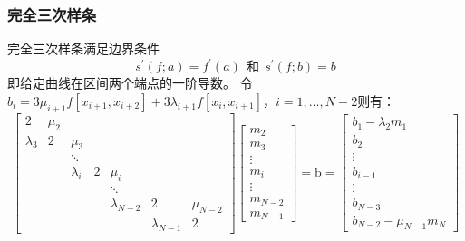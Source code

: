 \documentclass[a4paper]{article}
\begin{document}
\subsubsection{完全三次样条}
完全三次样条满足边界条件
\begin{equation}
    s^\prime(f;a) = f^\prime(a) \ \ 和 \ \ s^\prime(f;b)=b
\end{equation}
即给定曲线在区间两个端点的一阶导数。
令$b_i =3\mu_{i+1} f[x_{i+1},x_{i+2}]+3\lambda_{i+1}f[x_{i},x_{i+1}] ，i=1,\dots,N-2$则有：
\begin{equation}
\begin{bmatrix}2&\mu_2\\\lambda_3&2&\mu_3\\&&\ddots\\&&\lambda_i&2&\mu_i\\&&&&\ddots\\&&&&\lambda_{N-2}&2&\mu_{N-2}\\&&&&&\lambda_{N-1}&2\end{bmatrix}\begin{bmatrix}m_2\\m_3\\\vdots\\m_i\\\vdots\\m_{N-2}\\m_{N-1}\end{bmatrix}=\mathrm{b} = \begin{bmatrix}
    b_1-\lambda_2m_1 \\
    b_2 \\
    \vdots\\
    b_{i-1}\\
    \vdots \\
     b_{N-3}\\ 
     b_{N-2} - \mu_{N-1}m_N
\end{bmatrix}
\end{equation}
\end{document}

